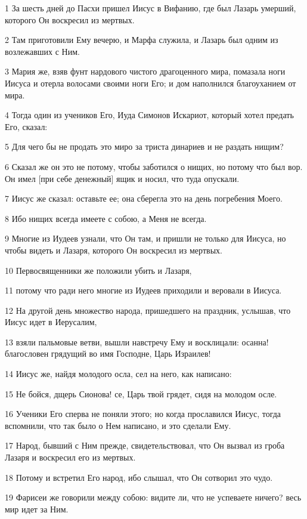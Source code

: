 \par 1 За шесть дней до Пасхи пришел Иисус в Вифанию, где был Лазарь умерший, которого Он воскресил из мертвых.
\par 2 Там приготовили Ему вечерю, и Марфа служила, и Лазарь был одним из возлежавших с Ним.
\par 3 Мария же, взяв фунт нардового чистого драгоценного мира, помазала ноги Иисуса и отерла волосами своими ноги Его; и дом наполнился благоуханием от мира.
\par 4 Тогда один из учеников Его, Иуда Симонов Искариот, который хотел предать Его, сказал:
\par 5 Для чего бы не продать это миро за триста динариев и не раздать нищим?
\par 6 Сказал же он это не потому, чтобы заботился о нищих, но потому что был вор. Он имел [при себе денежный] ящик и носил, что туда опускали.
\par 7 Иисус же сказал: оставьте ее; она сберегла это на день погребения Моего.
\par 8 Ибо нищих всегда имеете с собою, а Меня не всегда.
\par 9 Многие из Иудеев узнали, что Он там, и пришли не только для Иисуса, но чтобы видеть и Лазаря, которого Он воскресил из мертвых.
\par 10 Первосвященники же положили убить и Лазаря,
\par 11 потому что ради него многие из Иудеев приходили и веровали в Иисуса.
\par 12 На другой день множество народа, пришедшего на праздник, услышав, что Иисус идет в Иерусалим,
\par 13 взяли пальмовые ветви, вышли навстречу Ему и восклицали: осанна! благословен грядущий во имя Господне, Царь Израилев!
\par 14 Иисус же, найдя молодого осла, сел на него, как написано:
\par 15 Не бойся, дщерь Сионова! се, Царь твой грядет, сидя на молодом осле.
\par 16 Ученики Его сперва не поняли этого; но когда прославился Иисус, тогда вспомнили, что так было о Нем написано, и это сделали Ему.
\par 17 Народ, бывший с Ним прежде, свидетельствовал, что Он вызвал из гроба Лазаря и воскресил его из мертвых.
\par 18 Потому и встретил Его народ, ибо слышал, что Он сотворил это чудо.
\par 19 Фарисеи же говорили между собою: видите ли, что не успеваете ничего? весь мир идет за Ним.
